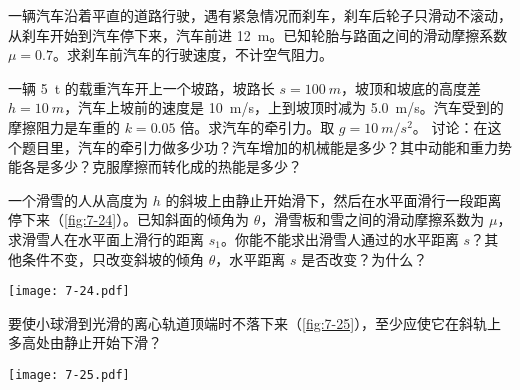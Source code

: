 \begin{Exercise}
\begin{question}
  \item 一辆汽车沿着平直的道路行驶，遇有紧急情况而刹车，刹车后轮子只滑动不滚动，从刹车开始到汽车停下来，汽车前进 \qty{12}{m}。已知轮胎与路面之间的滑动摩擦系数$\mu=0.7$。求刹车前汽车的行驶速度，不计空气阻力。
  \item 一辆 \qty{5}{t} 的载重汽车开上一个坡路，坡路长 $s=\qty{100}{m}$，坡顶和坡底的高度差 $h=\qty{10}{m}$，汽车上坡前的速度是 \qty{10}{m/s}，上到坡顶时减为 \qty{5.0}{m/s}。汽车受到的摩擦阻力是车重的 $k=0.05$ 倍。求汽车的牵引力。取 $g=\qty{10}{m/s^2}$。
  讨论：在这个题目里，汽车的牵引力做多少功？汽车增加的机械能是多少？其中动能和重力势能各是多少？克服摩擦而转化成的热能是多少？
  \item 一个滑雪的人从高度为 $h$ 的斜坡上由静止开始滑下，然后在水平面滑行一段距离停下来（\cref{fig:7-24}）。已知斜面的倾角为 $\theta$，滑雪板和雪之间的滑动摩擦系数为 $\mu$，求滑雪人在水平面上滑行的距离 $s_1$。你能不能求出滑雪人通过的水平距离 $s$？其他条件不变，只改变斜坡的倾角 $\theta$，水平距离 $s$ 是否改变？为什么？
\begin{figurehere}
  \begin{minipage}{\linewidth}\centering
    \texttt{[image: 7-24.pdf]}
    \caption{}\label{fig:7-24}
  \end{minipage}
\end{figurehere}
\item 要使小球滑到光滑的离心轨道顶端时不落下来（\cref{fig:7-25}），至少应使它在斜轨上多高处由静止开始下滑？
\begin{figurehere}
  \begin{minipage}{\linewidth}\centering
    \texttt{[image: 7-25.pdf]}
    \caption{}\label{fig:7-25}
  \end{minipage}
\end{figurehere}
\end{question}
\end{Exercise}